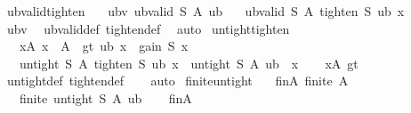 \begin{isabellebody}
\isanewline
{}\isamarkupfalse%
\ ub{\isacharunderscore}{\kern0pt}valid{\isacharunderscore}{\kern0pt}tighten{\isacharcolon}{\kern0pt}\isanewline
\ \ \ ubv{\isacharcolon}{\kern0pt}\ {\isachardoublequoteopen}ub{\isacharunderscore}{\kern0pt}valid\ S\ A\ ub{\isachardoublequoteclose}\isanewline
\ \ \ {\isachardoublequoteopen}ub{\isacharunderscore}{\kern0pt}valid\ S\ A\ {\isacharparenleft}{\kern0pt}tighten\ S\ ub\ x{\isacharparenright}{\kern0pt}{\isachardoublequoteclose}\isanewline
%
\isadelimproof
\ \ %
\endisadelimproof
%
\isatagproof
{}\isamarkupfalse%
\ ubv\ \isamarkupfalse%
\ ub{\isacharunderscore}{\kern0pt}valid{\isacharunderscore}{\kern0pt}def\ tighten{\isacharunderscore}{\kern0pt}def\ \isamarkupfalse%
\ auto%
\endisatagproof
{\isafoldproof}%
%
\isadelimproof
\isanewline
%
\endisadelimproof
\isanewline
{}\isamarkupfalse%
\ untight{\isacharunderscore}{\kern0pt}tighten{\isacharcolon}{\kern0pt}\isanewline
\ \ \ xA{\isacharcolon}{\kern0pt}\ {\isachardoublequoteopen}x\ {\isasymin}\ A{\isachardoublequoteclose}\ \ gt{\isacharcolon}{\kern0pt}\ {\isachardoublequoteopen}ub\ x\ {\isachargreater}{\kern0pt}\ gain\ S\ x{\isachardoublequoteclose}\isanewline
\ \ \ {\isachardoublequoteopen}untight\ S\ A\ {\isacharparenleft}{\kern0pt}tighten\ S\ ub\ x{\isacharparenright}{\kern0pt}\ {\isacharequal}{\kern0pt}\ untight\ S\ A\ ub\ {\isacharminus}{\kern0pt}\ {\isacharbraceleft}{\kern0pt}x{\isacharbraceright}{\kern0pt}{\isachardoublequoteclose}\isanewline
%
\isadelimproof
\ \ %
\endisadelimproof
%
\isatagproof
{}\isamarkupfalse%
\ xA\ gt\isanewline
\ \ \isamarkupfalse%
\ untight{\isacharunderscore}{\kern0pt}def\ tighten{\isacharunderscore}{\kern0pt}def\isanewline
\ \ \isamarkupfalse%
\ auto%
\endisatagproof
{\isafoldproof}%
%
\isadelimproof
\isanewline
%
\endisadelimproof
\isanewline
\isanewline
{}\isamarkupfalse%
\ finite{\isacharunderscore}{\kern0pt}untight{\isacharcolon}{\kern0pt}\isanewline
\ \ \ finA{\isacharcolon}{\kern0pt}\ {\isachardoublequoteopen}finite\ A{\isachardoublequoteclose}\isanewline
\ \ \ {\isachardoublequoteopen}finite\ {\isacharparenleft}{\kern0pt}untight\ S\ A\ ub{\isacharparenright}{\kern0pt}{\isachardoublequoteclose}\isanewline
%
\isadelimproof
\ \ %
\endisadelimproof
%
\isatagproof
{}\isamarkupfalse%
\ finA\ \isamarkupfalse%

\end{isabellebody}

